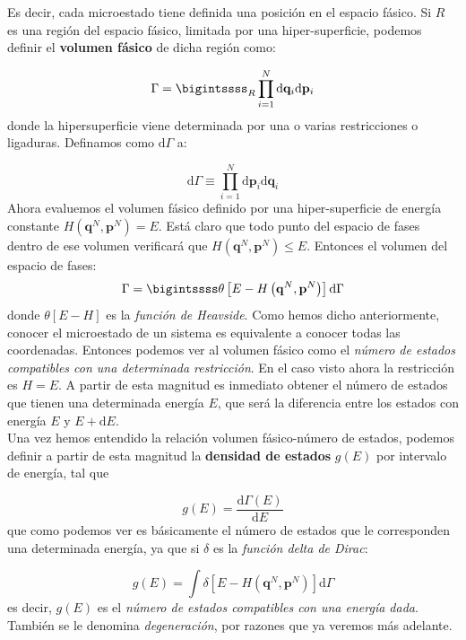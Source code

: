 \documentclass[12pt,a4paper]{article}
\numberwithin{equation}{section}
\numberwithin{figure}{section}
\newcommand{\parentesis}[1]{\left( #1  \right)}
\newcommand{\ccorchetes}[1]{\left[ #1  \right]}
\newcommand{\D}{\mathrm{d}}
\newcommand{\derivadas}[2]{\frac{\D #1}{\D #2}}
\newcommand{\pn}{\mathbf{p}}
\newcommand{\qn}{\mathbf{q}}
\theoremstyle{definition}
\begin{document}
Es decir, cada microestado tiene definida una posición en el espacio fásico. Si $R$ es una región del espacio fásico, limitada por una hiper-superficie, podemos definir el \textbf{volumen fásico} de dicha región como:

\begin{equation}
\Gamma  = \bigintssss_R \prod^N_{i=1} \D \qn_i \D \pn_i
\end{equation}
donde la hipersuperficie viene determinada por una o varias restricciones o ligaduras. Definamos como $\D \Gamma$ a:

\begin{equation}
\D \Gamma  \equiv \prod_{i=1}^N \D \pn_i \D \qn_i
\end{equation}
Ahora evaluemos el volumen fásico definido por una hiper-superficie de energía constante $H(\qn^N,\pn^N)=E$. Está claro que todo punto del espacio de fases dentro de ese volumen verificará que $H (\qn^N,\pn^N ) \leq  E$. Entonces el volumen del espacio de fases:
\begin{equation}
\Gamma = \bigintssss \theta\ccorchetes{E-H\parentesis{\qn^N,\pn^N}} \D \Gamma
\end{equation}
donde $\theta[E-H]$ es la \textit{función de Heavside}. Como hemos dicho anteriormente, conocer el microestado de un sistema es equivalente a conocer todas las coordenadas. Entonces podemos ver al volumen fásico como el \textit{número de estados compatibles con una determinada restricción}. En el caso visto ahora la restricción es $H=E$. A partir de esta magnitud es inmediato obtener el número de estados que tienen una determinada energía $E$, que será la diferencia entre los estados con energía $E$ y $E+\D E$. \\

Una vez hemos entendido la relación volumen fásico-número de estados, podemos definir a partir de esta magnitud la \textbf{densidad de estados} $g(E)$ por intervalo de energía, tal que

\begin{equation}
g(E) = \derivadas{\Gamma(E)}{E}
\end{equation}
que como podemos ver es básicamente el número de estados que le corresponden una determinada energía, ya que si $\delta$ es la \textit{función delta de Dirac}:

\begin{equation}
g(E) = \int \delta \ccorchetes{E-H\parentesis{\qn^N,\pn^N}} \D \Gamma
\end{equation}
es decir, $g(E)$ es el \textit{número de estados compatibles con una energía dada}. También se le denomina \textit{degeneración}, por razones que ya veremos más adelante. \\
\end{document}
